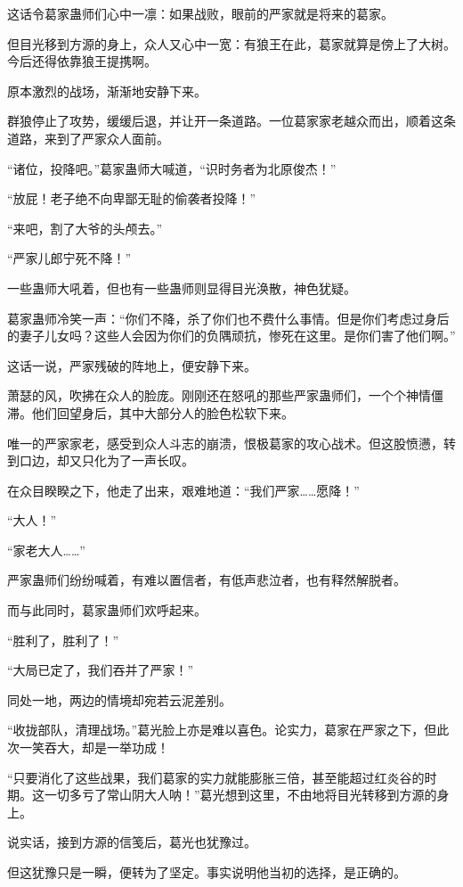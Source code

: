 \begin{this_body}
这话令葛家蛊师们心中一凛：如果战败，眼前的严家就是将来的葛家。

但目光移到方源的身上，众人又心中一宽：有狼王在此，葛家就算是傍上了大树。今后还得依靠狼王提携啊。

原本激烈的战场，渐渐地安静下来。

群狼停止了攻势，缓缓后退，并让开一条道路。一位葛家家老越众而出，顺着这条道路，来到了严家众人面前。

“诸位，投降吧。”葛家蛊师大喊道，“识时务者为北原俊杰！”

“放屁！老子绝不向卑鄙无耻的偷袭者投降！”

“来吧，割了大爷的头颅去。”

“严家儿郎宁死不降！”

一些蛊师大吼着，但也有一些蛊师则显得目光涣散，神色犹疑。

葛家蛊师冷笑一声：“你们不降，杀了你们也不费什么事情。但是你们考虑过身后的妻子儿女吗？这些人会因为你们的负隅顽抗，惨死在这里。是你们害了他们啊。”

这话一说，严家残破的阵地上，便安静下来。

萧瑟的风，吹拂在众人的脸庞。刚刚还在怒吼的那些严家蛊师们，一个个神情僵滞。他们回望身后，其中大部分人的脸色松软下来。

唯一的严家家老，感受到众人斗志的崩溃，恨极葛家的攻心战术。但这股愤懑，转到口边，却又只化为了一声长叹。

在众目睽睽之下，他走了出来，艰难地道：“我们严家……愿降！”

“大人！”

“家老大人……”

严家蛊师们纷纷喊着，有难以置信者，有低声悲泣者，也有释然解脱者。

而与此同时，葛家蛊师们欢呼起来。

“胜利了，胜利了！”

“大局已定了，我们吞并了严家！”

同处一地，两边的情境却宛若云泥差别。

“收拢部队，清理战场。”葛光脸上亦是难以喜色。论实力，葛家在严家之下，但此次一笑吞大，却是一举功成！

“只要消化了这些战果，我们葛家的实力就能膨胀三倍，甚至能超过红炎谷的时期。这一切多亏了常山阴大人呐！”葛光想到这里，不由地将目光转移到方源的身上。

说实话，接到方源的信笺后，葛光也犹豫过。

但这犹豫只是一瞬，便转为了坚定。事实说明他当初的选择，是正确的。


\end{this_body}
